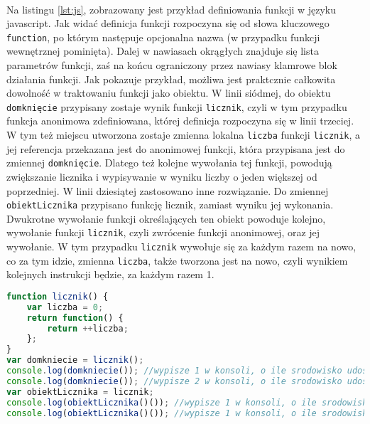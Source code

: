 \documentclass[a4paper,10pt]{report}
\begin{document}
\paragraph{}
Na listingu \ref{lst:js}, zobrazowany jest przykład definiowania funkcji w języku javascript. Jak widać definicja funkcji rozpoczyna się od słowa kluczowego \verb|function|, po którym następuje opcjonalna nazwa (w przypadku funkcji wewnętrznej pominięta). Dalej w nawiasach okrągłych znajduje się lista parametrów funkcji, zaś na końcu ograniczony przez nawiasy klamrowe blok działania funkcji. Jak pokazuje przykład, możliwa jest praktcznie całkowita dowolność w traktowaniu funkcji jako obiektu. W linii siódmej, do obiektu \verb|domknięcie| przypisany zostaje wynik funkcji \verb|licznik|, czyli w tym przypadku funkcja anonimowa zdefiniowana, której definicja rozpoczyna się w linii trzeciej. W tym też miejscu utworzona zostaje zmienna lokalna \verb|liczba| funkcji \verb|licznik|, a jej referencja przekazana jest do anonimowej funkcji, która przypisana jest do zmiennej \verb|domknięcie|. Dlatego też kolejne wywołania tej funkcji, powodują zwiększanie licznika i wypisywanie w wyniku liczby o jeden większej od poprzedniej. W linii dziesiątej zastosowano inne rozwiązanie. Do zmiennej \verb|obiektLicznika| przypisano funkcję licznik, zamiast wyniku jej wykonania. Dwukrotne wywołanie funkcji określających ten obiekt powoduje kolejno, wywołanie funkcji \verb|licznik|, czyli zwrócenie funkcji anonimowej, oraz jej wywołanie. W tym przypadku \verb|licznik| wywołuje się za każdym razem na nowo, co za tym idzie, zmienna \verb|liczba|, także tworzona jest na nowo, czyli wynikiem kolejnych instrukcji będzie, za każdym razem 1.
\begin{lstlisting}[caption={Funkcyjność w języku javascript},label={lst:js},language=Javascript]
function licznik() {
	var liczba = 0;
	return function() {
		return ++liczba;
	};
}
var domkniecie = licznik();
console.log(domkniecie()); //wypisze 1 w konsoli, o ile srodowisko udostepnia obiekt console
console.log(domkniecie()); //wypisze 2 w konsoli, o ile srodowisko udostepnia obiekt console
var obiektLicznika = licznik;
console.log(obiektLicznika()()); //wypisze 1 w konsoli, o ile srodowisko udostepnia obiekt console
console.log(obiektLicznika()()); //wypisze 1 w konsoli, o ile srodowisko udostepnia obiekt console
\end{lstlisting}
\end{document}
